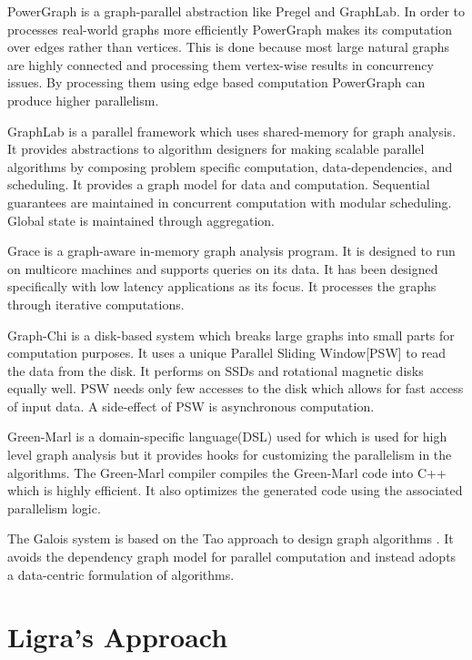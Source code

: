 \documentclass[a4paper,10pt,twoside]{article}
\begin{document}
	PowerGraph \cite{gonzalez2012powergraph} is a graph-parallel abstraction like Pregel and GraphLab. In order to processes real-world graphs more efficiently PowerGraph makes its computation over edges rather than vertices. This is done because most large natural graphs are highly connected and processing them vertex-wise results in concurrency issues. By processing them using edge based computation PowerGraph can produce higher parallelism.

	GraphLab \cite{low2010graphlab} is a parallel framework which uses shared-memory for graph analysis. It provides abstractions to algorithm designers for making scalable parallel algorithms by composing problem specific computation, data-dependencies, and scheduling. It provides a graph model for data and computation. Sequential guarantees are maintained in concurrent computation with modular scheduling. Global state is maintained through aggregation.

	Grace \cite{Prabhakaran:2012:MLG:2342821.2342825} is a graph-aware in-memory graph analysis program. It is designed to run on multicore machines and supports queries on its data. It has been designed specifically with low latency applications as its focus. It processes the graphs through iterative computations.

	Graph-Chi \cite{Kyrola:2012:GLG:2387880.2387884} is a disk-based system which breaks large graphs into small parts for computation purposes. It uses a unique Parallel Sliding Window[PSW] to read the data from the disk. It performs on SSDs and rotational magnetic disks equally well. PSW needs only few accesses to the disk which allows for fast access of input data. A side-effect of PSW is asynchronous computation. 

Green-Marl \cite{Hong:2012:GDE:2189750.2151013} is a domain-specific language(DSL) used for which is used for high level graph analysis but it provides hooks for customizing the parallelism in the algorithms. The Green-Marl compiler compiles the Green-Marl code into C++ which is highly efficient. It also optimizes the generated code using the associated parallelism logic. 

The Galois system is based on the Tao approach to design graph algorithms \cite{Pingali:2011:TPA:1993498.1993501}. It avoids the dependency graph model for parallel computation and instead adopts a data-centric formulation of algorithms.

\section{Ligra's Approach}
\end{document}
